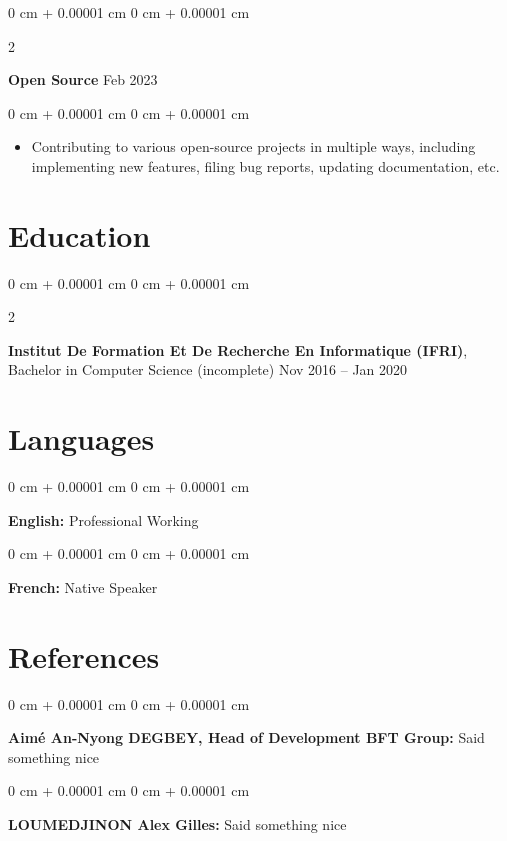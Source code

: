 \documentclass[10pt, letterpaper]{article}
\newenvironment{highlights}{
    \begin{itemize}[
        topsep=0.10 cm,
        parsep=0.10 cm,
        partopsep=0pt,
        itemsep=0pt,
        leftmargin=0 cm + 10pt
    ]
}{
    \end{itemize}
} %
\newenvironment{onecolentry}{
    \begin{adjustwidth}{
        0 cm + 0.00001 cm
    }{
        0 cm + 0.00001 cm
    }
}{
    \end{adjustwidth}
} %
\newenvironment{twocolentry}[2][]{
    \onecolentry
    \def\secondColumn{#2}
    \setcolumnwidth{\fill, 4.5 cm}
    \begin{paracol}{2}
}{
    \switchcolumn \raggedleft \secondColumn
    \end{paracol}
    \endonecolentry
} %
\begin{document}
        
        \begin{twocolentry}{
            Feb 2023
        }
            \textbf{Open Source}\end{twocolentry}

        \vspace{0.10 cm}
        \begin{onecolentry}
            \begin{highlights}
                \item Contributing to various open-source projects in multiple ways, including implementing new features, filing bug reports, updating documentation, etc.
            \end{highlights}
        \end{onecolentry}



    
    \section{Education}



        
        \begin{twocolentry}{
            Nov 2016 – Jan 2020
        }
            \textbf{Institut De Formation Et De Recherche En Informatique (IFRI)}, Bachelor in Computer Science (incomplete)\end{twocolentry}




    
    \section{Languages}



        
        \begin{onecolentry}
            \textbf{English:} Professional Working
        \end{onecolentry}

        \vspace{0.2 cm}

        \begin{onecolentry}
            \textbf{French:} Native Speaker
        \end{onecolentry}


    
    \section{References}



        
        \begin{onecolentry}
            \textbf{Aimé An-Nyong DEGBEY, Head of Development BFT Group:} Said something nice
        \end{onecolentry}

        \vspace{0.2 cm}

        \begin{onecolentry}
            \textbf{LOUMEDJINON Alex Gilles:} Said something nice
        \end{onecolentry}


    
\end{document}
